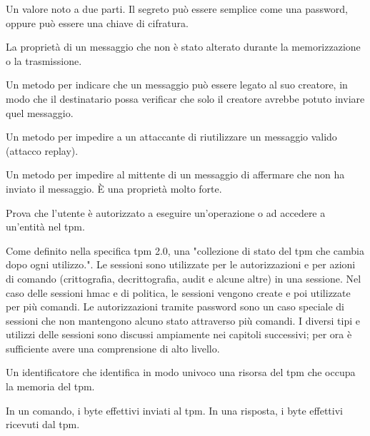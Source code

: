 \begin{description}[itemsep=2.5ex, parsep=0.5ex, leftmargin=2.5cm, style=nextline]
    \item[\textbf{Segreto condiviso}] Un valore noto a due parti. Il segreto può essere semplice come una password, oppure può essere una chiave di cifratura.

    \item[\textbf{Integrità}] La proprietà di un messaggio che non è stato alterato durante la memorizzazione o la trasmissione.

    \item[\textbf{Autenticazione}] Un metodo per indicare che un messaggio può essere legato al suo creatore, in modo che il destinatario possa verificar che solo il creatore avrebbe potuto inviare quel messaggio.

    \item[\textbf{Anti-ripetizione}] Un metodo per impedire a un attaccante di riutilizzare un messaggio valido (attacco replay).

    \item[\textbf{Non-ripudio}] Un metodo per impedire al mittente di un messaggio di affermare che non ha inviato il messaggio. È una proprietà molto forte.

    \item[\textbf{Autorizzazione}] Prova che l'utente è autorizzato a eseguire un'operazione o ad accedere a un'entità nel \acrshort{tpm}. 

    \item[\textbf{Sessione}] Come definito nella specifica \acrshort{tpm} 2.0, una "collezione di stato del \acrshort{tpm} che cambia dopo ogni utilizzo.". Le sessioni sono utilizzate per le autorizzazioni e per azioni di comando (crittografia, decrittografia, audit e alcune altre) in una sessione. Nel caso delle sessioni \acrshort{hmac} e di politica, le sessioni vengono create e poi utilizzate per più comandi. Le autorizzazioni tramite password sono un caso speciale di sessioni che non mantengono alcuno stato attraverso più comandi. I diversi tipi e utilizzi delle sessioni sono discussi ampiamente nei capitoli successivi; per ora è sufficiente avere una comprensione di alto livello.

    \item[\textbf{Handle}] Un identificatore che identifica in modo univoco una risorsa del \acrshort{tpm} che occupa la memoria del \acrshort{tpm}.

    \item[\textbf{Flusso di byte}] In un comando, i byte effettivi inviati al \acrshort{tpm}. In una risposta, i byte effettivi ricevuti dal \acrshort{tpm}.


\end{description}
